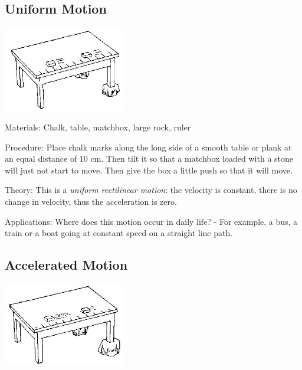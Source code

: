 \begin{multicols}{2}
\subsection{Uniform Motion}

\begin{center}
\includegraphics[width=0.4\textwidth]{./img/source/uniform.jpg}
\end{center}

\begin{description*}
\item[Materials:]{Chalk, table, matchbox, large rock, ruler}
\item[Procedure:]{Place chalk marks along the long side of a smooth table or plank at an equal distance of
10 cm. Then tilt it so that a matchbox loaded with a stone will just not start to move. Then give
the box a little push so that it will move.}
\item[Theory:]{This is a \emph{uniform rectilinear motion}: the velocity is constant, there is no change in
velocity, thus the acceleration is zero.}
\item[Applications:]{Where does this motion occur in daily life? - For example, a bus, a train or a boat going at
constant speed on a straight line path.}
\end{description*}

\columnbreak

\subsection{Accelerated Motion} 

\begin{center}
\includegraphics[width=0.4\textwidth]{./img/source/accelerated.jpg}
\end{center}


\end{multicols}

